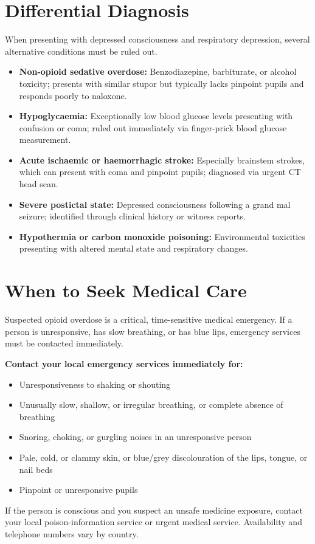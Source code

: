 \section*{Differential Diagnosis}
When presenting with depressed consciousness and respiratory depression, several alternative conditions must be ruled out.
\begin{itemize}
    \item \textbf{Non-opioid sedative overdose:} Benzodiazepine, barbiturate, or alcohol toxicity; presents with similar stupor but typically lacks pinpoint pupils and responds poorly to naloxone.
    \item \textbf{Hypoglycaemia:} Exceptionally low blood glucose levels presenting with confusion or coma; ruled out immediately via finger-prick blood glucose measurement.
    \item \textbf{Acute ischaemic or haemorrhagic stroke:} Especially brainstem strokes, which can present with coma and pinpoint pupils; diagnosed via urgent CT head scan.
    \item \textbf{Severe postictal state:} Depressed consciousness following a grand mal seizure; identified through clinical history or witness reports.
    \item \textbf{Hypothermia or carbon monoxide poisoning:} Environmental toxicities presenting with altered mental state and respiratory changes.
\end{itemize}

\section*{When to Seek Medical Care}
Suspected opioid overdose is a critical, time-sensitive medical emergency. If a person is unresponsive, has slow breathing, or has blue lips, emergency services must be contacted immediately.

\textbf{Contact your local emergency services immediately for:}
\begin{itemize}
    \item Unresponsiveness to shaking or shouting
    \item Unusually slow, shallow, or irregular breathing, or complete absence of breathing
    \item Snoring, choking, or gurgling noises in an unresponsive person
    \item Pale, cold, or clammy skin, or blue/grey discolouration of the lips, tongue, or nail beds
    \item Pinpoint or unresponsive pupils
\end{itemize}
If the person is conscious and you suspect an unsafe medicine exposure, contact your local poison-information service or urgent medical service. Availability and telephone numbers vary by country.

